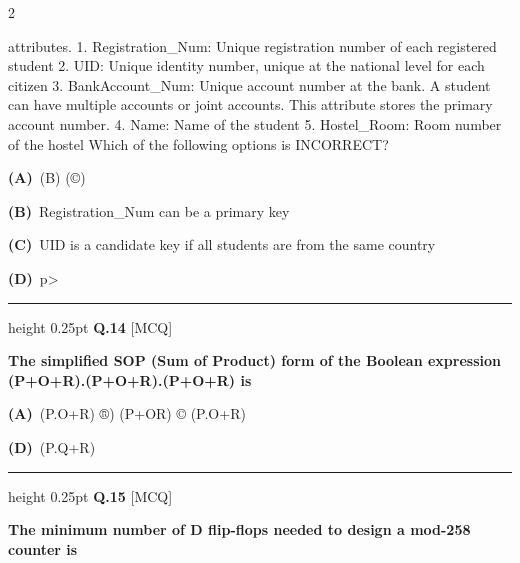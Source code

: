 \documentclass[a4paper,10pt,twoside]{article}
\begin{document}
\begin{multicols}{2}
{attributes.
1. Registration\_Num: Unique registration number of each registered student
2. UID: Unique identity number, unique at the national level for each citizen
3. BankAccount\_Num: Unique account number at the bank. A student can have multiple
accounts or joint accounts. This attribute stores the primary account number.
4. Name: Name of the student
5. Hostel\_Room: Room number of the hostel
Which of the following options is INCORRECT? \par}
\par\vspace{2pt}\noindent
\textbf{(A)}~(B) \newline (©)\par\vspace{2pt}\noindent
\textbf{(B)}~Registration\_Num can be a primary key\par\vspace{2pt}\noindent
\textbf{(C)}~UID is a candidate key if all students are from the same country\par\vspace{2pt}\noindent
\textbf{(D)}~p>
\par\vspace{6pt}\hrule height 0.25pt\vspace{6pt}
\noindent\textbf{Q.14} \hfill {\footnotesize\textsf{[MCQ]}}
\par\vspace{2pt}
{\bfseries The simplified SOP (Sum of Product) form of the Boolean expression
(P+O+R).(P+O+R).(P+O+R) is \par}
\par\vspace{2pt}\noindent
\textbf{(A)}~(P.O+R) ®) (P+OR) \newline © (P.O+R)\par\vspace{2pt}\noindent
\textbf{(D)}~(P.Q+R)
\par\vspace{6pt}\hrule height 0.25pt\vspace{6pt}
\noindent\textbf{Q.15} \hfill {\footnotesize\textsf{[MCQ]}}
\par\vspace{2pt}
{\bfseries The minimum number of D flip-flops needed to design a mod-258 counter is \par}
\par\vspace{2pt}\noindent
\begin{tabular*}{\columnwidth}{@{\extracolsep{\fill}}p{}p{}@{}}

\end{tabular*}
\end{multicols}
\end{document}
